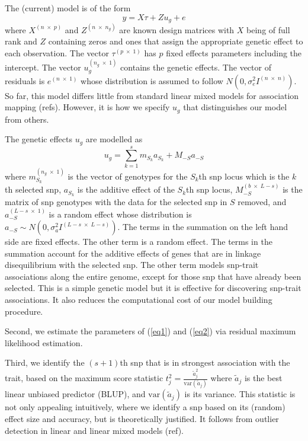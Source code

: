 \documentclass{nature}
\begin{document}
The (current) model is of the form 
\begin{equation}
\label{eq1}
y = X \tau + Z u_g + e
\end{equation}
where 
$X^{(n \; \times \; p)}$ and $Z^{( n \; \times \; n_g)}$ are known design matrices with $X$ being of full rank and $Z$ 
containing zeros and ones that assign the appropriate genetic effect to each observation. 
The vector 
$\tau^{(p \; \times \; 1)}$ has $p$ fixed effects parameters including the intercept. The vector 
$u_g^{(n_g \; \times \; 1)}$ contains the 
genetic effects. The vector of residuals is 
$e^{(n \; \times \;1)}$ whose distribution is assumed to follow $N(0, \sigma^2_e I^{(n \; \times \; n)})$. 
So far,  this model differs little from standard linear mixed models for association mapping (refs). 
However, 
it is how we specify $u_g$ that distinguishes our model from others. 

The genetic effects $u_g$ are modelled as 
\begin{equation}
\label{eq2}
u_g = \sum_{k=1}^s  m_{S_k} a_{S_k} + M_{-S} a_{-S}
\end{equation}
where $m_{S_k}^{(n_g \; \times \; 1)}$ is the vector of genotypes for the $S_k$th snp locus which is the $k$th selected snp, 
$a_{S_k}$ is the additive effect of the $S_k$th snp locus, $M_{-S}^{(b \; \times \; L-s)}$ is the matrix of  snp genotypes 
with the data for the selected snp in $S$ removed,  and $a_{-S}^{(L-s \; \times  \; 1)}$ is a random effect whose distribution is 
$a_{-S} \sim N(0, \sigma_a^2 I^{(L-s \; \times \;  L-s)})$. 
The terms in the summation on the left hand side are fixed effects.  The other term is a random effect.  The terms 
in the summation account 
for the additive effects of genes that are in linkage disequilibrium with the selected snp. The other term models 
snp-trait associations along the entire genome, except for those snp that have already been selected. 
This is a simple genetic model but it 
is effective for discovering snp-trait associations. It also reduces the computational cost of our model building procedure. 


Second, we estimate the parameters of (\ref{eq1}) and (\ref{eq2}) via residual maximum likelihood estimation. 

Third, we identify the $(s+1)$th snp that is in strongest association with the trait, based on the maximum score statistic
$t_j^2 = \frac{ \widetilde{a} _j^2}{\textrm{var}(\widetilde{a}_j)}$ where $\widetilde{a}_j$ is the best linear unbiased predictor (BLUP), 
and $\textrm{var}(\widetilde{a}_j)$ is its variance. This statistic is not only appealing intuitively, where we 
identify a snp based on its (random) effect size and accuracy, but is theoretically justified.  It follows from outlier detection 
in linear and linear mixed models (ref). 
\end{document}
